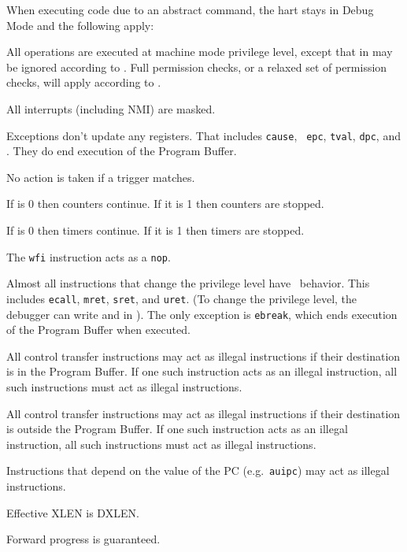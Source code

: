 \begin{steps}{When executing code due to an abstract command, the hart stays in
    Debug Mode and the following apply:}
\item All operations are executed at machine mode privilege level, except that
    \FcsrMstatusMprv in \Rmstatus may be ignored according to \FcsrDcsrMprven.
    Full permission checks, or a relaxed set of permission checks, will apply
    according to \FdmAbstractcsRelaxedpriv.
\item All interrupts (including NMI) are masked.
\item Exceptions don't update any registers.  That includes {\tt cause}, {\tt
    epc}, {\tt tval}, {\tt dpc}, and \Rmstatus. They do end execution of the
    Program Buffer.
\item No action is taken if a trigger matches.
\item If \FcsrDcsrStopcount is 0 then counters continue. If it is 1 then
    counters are stopped.
\item If \FcsrDcsrStoptime is 0 then timers continue. If it is 1 then
    timers are stopped.
\item The {\tt wfi} instruction acts as a {\tt nop}.
\item Almost all instructions that change the privilege level have \unspecified\ 
    behavior.  This includes {\tt ecall}, {\tt mret}, {\tt sret}, and {\tt uret}.
    (To change the privilege level, the debugger can write
    \FcsrDcsrPrv and \FcsrDcsrV in \RcsrDcsr). The only exception is {\tt ebreak}, which ends
    execution of the Program Buffer when executed.
\item All control transfer instructions may act as illegal instructions if
    their destination is in the Program Buffer. If one such instruction acts as
    an illegal instruction, all such instructions must act as illegal
    instructions.
\item All control transfer instructions may act as illegal instructions if
    their destination is outside the Program Buffer. If one such instruction
    acts as an illegal instruction, all such instructions must act as
    illegal instructions.
\item Instructions that depend on the value of the PC (e.g.\ {\tt auipc}) may act
    as illegal instructions.
\item Effective XLEN is DXLEN.
\item Forward progress is guaranteed.
\end{steps}

